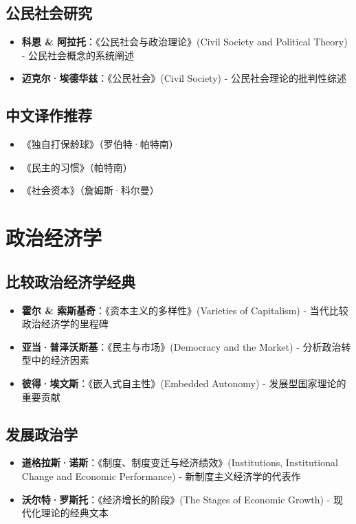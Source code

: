 \subsection{公民社会研究}
\begin{itemize}
    \item \textbf{科恩 \& 阿拉托}：《公民社会与政治理论》(Civil Society and Political Theory)
    \quad - 公民社会概念的系统阐述
    \item \textbf{迈克尔·埃德华兹}：《公民社会》(Civil Society)
    \quad - 公民社会理论的批判性综述
\end{itemize}

\subsection{中文译作推荐}
\begin{itemize}
    \item 《独自打保龄球》（罗伯特·帕特南）
    \item 《民主的习惯》（帕特南）
    \item 《社会资本》（詹姆斯·科尔曼）
\end{itemize}

\section{政治经济学}

\subsection{比较政治经济学经典}
\begin{itemize}
    \item \textbf{霍尔 \& 索斯基奇}：《资本主义的多样性》(Varieties of Capitalism)
    \quad - 当代比较政治经济学的里程碑
    \item \textbf{亚当·普泽沃斯基}：《民主与市场》(Democracy and the Market)
    \quad - 分析政治转型中的经济因素
    \item \textbf{彼得·埃文斯}：《嵌入式自主性》(Embedded Autonomy)
    \quad - 发展型国家理论的重要贡献
\end{itemize}

\subsection{发展政治学}
\begin{itemize}
    \item \textbf{道格拉斯·诺斯}：《制度、制度变迁与经济绩效》(Institutions, Institutional Change and Economic Performance)
    \quad - 新制度主义经济学的代表作
    \item \textbf{沃尔特·罗斯托}：《经济增长的阶段》(The Stages of Economic Growth)
    \quad - 现代化理论的经典文本
\end{itemize}

